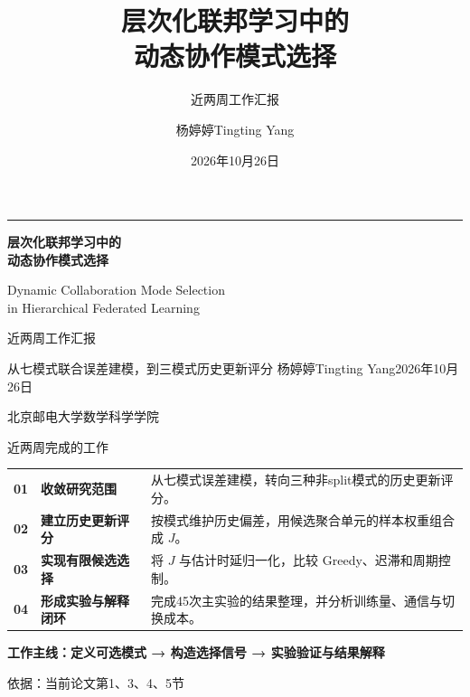 \documentclass[aspectratio=169,11pt]{beamer}
\title{层次化联邦学习中的\\动态协作模式选择}
\subtitle{近两周工作汇报}
\author{杨婷婷\quad Tingting Yang}
\institute{北京邮电大学\quad 数学科学学院}
\date{2026年10月26日}
\newcommand{\key}[1]{{\color{Teal}\bfseries #1}}
\newcommand{\src}[1]{\vfill{\color{Gray}\fontsize{7.5}{9}\selectfont 依据：#1\par}}
\newcommand{\msg}[1]{\par\vspace{.14cm}{\color{Teal}\rule{.32cm}{1.5pt}}\hspace{.18cm}\textbf{#1}\par}
\begin{document}
\begin{frame}[plain]
\par\vspace{.5cm}
{\color{Teal}\rule{1.0cm}{2.5pt}}\par\vspace{.45cm}
{\LARGE\bfseries 层次化联邦学习中的\\[.18cm]动态协作模式选择\par}
\par\vspace{.35cm}
{\small Dynamic Collaboration Mode Selection\\in Hierarchical Federated Learning\par}
\par\vspace{.55cm}
{\large 近两周工作汇报\par}
\par\vspace{.22cm}
从七模式联合误差建模，到三模式历史更新评分
\vfill
杨婷婷\quad Tingting Yang\hfill 2026年10月26日\par
\par\vspace{.12cm}
{\small 北京邮电大学\quad 数学科学学院}
\end{frame}

\begin{frame}{近两周完成的工作}
\renewcommand{\arraystretch}{1.7}
\begin{tabular}{@{}p{.6cm}p{3.15cm}p{9.0cm}@{}}
\key{01} & \textbf{收敛研究范围} & 从七模式误差建模，转向三种非split模式的历史更新评分。\\
\key{02} & \textbf{建立历史更新评分} & 按模式维护历史偏差，用候选聚合单元的样本权重组合成 $J$。\\
\key{03} & \textbf{实现有限候选选择} & 将 $J$ 与估计时延归一化，比较 Greedy、迟滞和周期控制。\\
\key{04} & \textbf{形成实验与解释闭环} & 完成45次主实验的结果整理，并分析训练量、通信与切换成本。\\
\end{tabular}\par
\msg{工作主线：定义可选模式 → 构造选择信号 → 实验验证与结果解释}
\src{当前论文第1、3、4、5节}
\end{frame}
\end{document}
